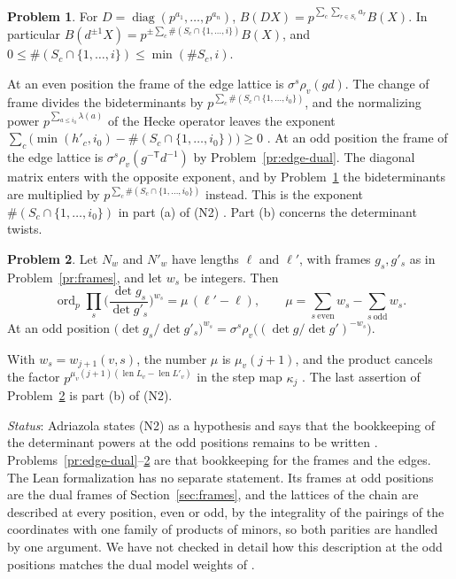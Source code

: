 \documentclass[reqno]{amsart}
\theoremstyle{definition}
\newtheorem{problem}{Problem}[section]
\theoremstyle{plain}
\theoremstyle{remark}
\newcommand{\len}{\operatorname{len}}
\newcommand{\ord}{\operatorname{ord}}
\begin{document}
\begin{problem}\label{pr:bidet}
For \(D=\operatorname{diag}(p^{a_1},\dots,p^{a_n})\), \(B(DX)=p^{\sum_c\sum_{r\in S_c}a_r}B(X)\).  In particular \(B(d^{\pm1}X)=p^{\pm\sum_c\#(S_c\cap\{1,\dots,i\})}B(X)\), and \(0\le\#(S_c\cap\{1,\dots,i\})\le\min(\#S_c,i)\).
\end{problem}

At an even position the frame of the edge lattice is \(\sigma^s\rho_v(gd)\).  The change of frame divides the bideterminants by \(p^{\sum_c\#(S_c\cap\{1,\dots,i_0\})}\), and the normalizing power \(p^{\sum_{a\le i_0}\lambda(a)}\) of the Hecke operator leaves the exponent \(\sum_c\big(\min(h'_c,i_0)-\#(S_c\cap\{1,\dots,i_0\})\big)\ge0\) \cite[Lemma~11.4, Thm.~11.35]{Adr}.  At an odd position the frame of the edge lattice is \(\sigma^s\rho_v(g^{-\mathsf T}d^{-1})\) by Problem~\ref{pr:edge-dual}.  The diagonal matrix enters with the opposite exponent, and by Problem~\ref{pr:bidet} the bideterminants are multiplied by \(p^{\sum_c\#(S_c\cap\{1,\dots,i_0\})}\) instead.  This is the exponent \(\#(S_c\cap\{1,\dots,i_0\})\) in part (a) of (N2) \cite[Hyp.~11.38]{Adr}.  Part (b) concerns the determinant twists.

\begin{problem}\label{pr:twist}
Let \(N_w\) and \(N'_w\) have lengths \(\ell\) and \(\ell'\), with frames \(g_s,g'_s\) as in Problem~\ref{pr:frames}, and let \(w_s\) be integers.  Then
\[
 \ord_p\prod_s\Big(\frac{\det g_s}{\det g'_s}\Big)^{w_s}=\mu\,(\ell'-\ell),\qquad \mu=\sum_{s\ \mathrm{even}}w_s-\sum_{s\ \mathrm{odd}}w_s .
\]
At an odd position \(\big(\det g_s/\det g'_s\big)^{w_s}=\sigma^s\rho_v\big((\det g/\det g')^{-w_s}\big)\).
\end{problem}

With \(w_s=w_{j+1}(v,s)\), the number \(\mu\) is \(\mu_v(j+1)\), and the product cancels the factor \(p^{\mu_v(j+1)(\len L_v-\len L'_v)}\) in the step map \(\kappa_j\) \cite[Def.~11.9]{Adr}.  The last assertion of Problem~\ref{pr:twist} is part (b) of (N2).

\emph{Status}: Adriazola states (N2) as a hypothesis and says that the bookkeeping of the determinant powers at the odd positions remains to be written \cite[Hyp.~11.38, Remark~11.39]{Adr}.  Problems~\ref{pr:edge-dual}--\ref{pr:twist} are that bookkeeping for the frames and the edges.  The Lean formalization has no separate statement.  Its frames at odd positions are the dual frames of Section~\ref{sec:frames}, and the lattices of the chain are described at every position, even or odd, by the integrality of the pairings of the coordinates with one family of products of minors, so both parities are handled by one argument.  We have not checked in detail how this description at the odd positions matches the dual model weights of \cite[\S11.1]{Adr}.
\end{document}
